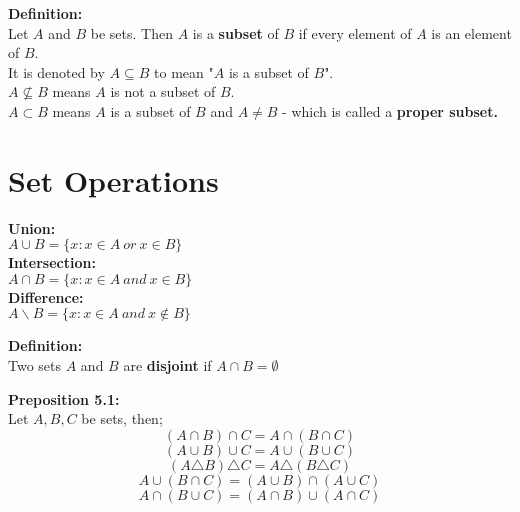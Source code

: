 \documentclass{report}
\newenvironment{frameblue}[1][BlueViolet]
  {\begin{tcolorbox}[colframe=#1,colback=white]}
  {\end{tcolorbox}}
\newenvironment{framered}[1][Maroon]
  {\begin{tcolorbox}[colframe=#1,colback=white]}
  {\end{tcolorbox}}
\begin{document}
\begin{frameblue}
    \textbf{Definition:}\\
    Let $A$ and $B$ be sets. Then $A$ is a \textbf{subset} of $B$ if every element of $A$ is an element of $B$. \\
    It is denoted by $A \subseteq B$ to mean "$A$ is a subset of $B$".\\
    $A \nsubseteq B$ means $A$ is not a subset of $B$.\\
    $A \subset B$ means $A$ is a subset of $B$ and $A \neq B$ - which is called a \textbf{proper subset.}
\end{frameblue}

\section{Set Operations}

\textbf{Union:}\\
$A \cup B = \{ x: x \in A \: or \: x \in B \}$\\

\textbf{Intersection:}\\
$A \cap B = \{ x: x \in A \: and \: x \in B \}$\\

\textbf{Difference:}\\
$A \backslash B = \{ x: x \in A \: and \: x \notin B \}$\\

\begin{frameblue}
    \textbf{Definition:}\\
    Two sets $A$ and $B$ are \textbf{disjoint} if $A \cap B = \emptyset$
\end{frameblue}

\begin{framered}
    \textbf{Preposition 5.1:}\\
    Let $A, B, C$ be sets, then;
    \begin{equation}
        (A \cap B) \cap C = A \cap (B \cap C)
    \end{equation}
    \begin{equation}
        (A \cup B) \cup C = A \cup (B \cup C)
    \end{equation}
    \begin{equation}
        (A \triangle B) \triangle C = A \triangle (B \triangle C)
    \end{equation}
    \begin{equation}
        A \cup (B \cap C) = (A \cup B) \cap (A \cup C)
    \end{equation}
    \begin{equation}
        A \cap (B \cup C) = (A \cap B) \cup (A \cap C)
    \end{equation}
\end{framered}
\end{document}
